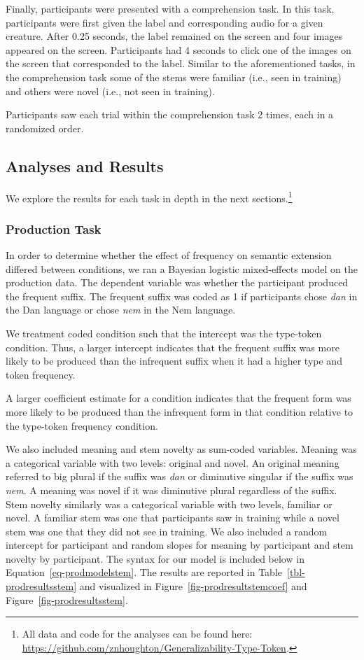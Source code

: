 \documentclass[
  letterpaper,
  DIV=11,
  numbers=noendperiod]{scrartcl}
\begin{document}
Finally, participants were presented with a comprehension task. In this
task, participants were first given the label and corresponding audio
for a given creature. After 0.25 seconds, the label remained on the
screen and four images appeared on the screen. Participants had 4
seconds to click one of the images on the screen that corresponded to
the label. Similar to the aforementioned tasks, in the comprehension
task some of the stems were familiar (i.e., seen in training) and others
were novel (i.e., not seen in training).

Participants saw each trial within the comprehension task 2 times, each
in a randomized order.

\subsection{Analyses and Results}\label{analyses-and-results}

We explore the results for each task in depth in the next
sections.\footnote{All data and code for the analyses can be found here:
  \url{https://github.com/znhoughton/Generalizability-Type-Token}.}

\subsubsection{Production Task}\label{production-task-1}

In order to determine whether the effect of frequency on semantic
extension differed between conditions, we ran a Bayesian logistic
mixed-effects model on the production data. The dependent variable was
whether the participant produced the frequent suffix. The frequent
suffix was coded as 1 if participants chose \emph{dan} in the Dan
language or chose \emph{nem} in the Nem language.

We treatment coded condition such that the intercept was the type-token
condition. Thus, a larger intercept indicates that the frequent suffix
was more likely to be produced than the infrequent suffix when it had a
higher type and token frequency.

A larger coefficient estimate for a condition indicates that the
frequent form was more likely to be produced than the infrequent form in
that condition relative to the type-token frequency condition.

We also included meaning and stem novelty as sum-coded variables.
Meaning was a categorical variable with two levels: original and novel.
An original meaning referred to big plural if the suffix was \emph{dan}
or diminutive singular if the suffix was \emph{nem}. A meaning was novel
if it was diminutive plural regardless of the suffix. Stem novelty
similarly was a categorical variable with two levels, familiar or novel.
A familiar stem was one that participants saw in training while a novel
stem was one that they did not see in training. We also included a
random intercept for participant and random slopes for meaning by
participant and stem novelty by participant. The syntax for our model is
included below in Equation~\ref{eq-prodmodelstem}. The results are
reported in Table~\ref{tbl-prodresultsstem} and visualized in
Figure~\ref{fig-prodresultstemcoef} and
Figure~\ref{fig-prodresultsstem}.
\end{document}
